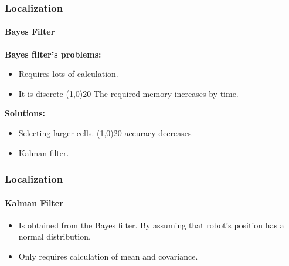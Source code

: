 \documentclass{beamer}
\begin{document}
	\begin{frame}
		\frametitle{Localization}
		
		\framesubtitle{Bayes Filter}

		\textbf{Bayes filter's problems:}
		\begin{itemize}
			\item Requires lots of calculation.
			\item It is discrete \thicklines \vector(1,0){20} The required memory increases by time.
		\end{itemize}
		\textbf{Solutions:}
		\begin{itemize}
			\item Selecting larger cells. \thicklines \vector(1,0){20} accuracy decreases
			\item Kalman filter.
		\end{itemize}
	\end{frame}



	\begin{frame}
		\frametitle{Localization}
		
		\framesubtitle{Kalman Filter}

		\begin{itemize}
			\item Is obtained from the Bayes filter. By assuming that robot's position has a normal distribution.
			\item Only requires calculation of mean and covariance.
		\end{itemize}

	\end{frame}
\end{document}
